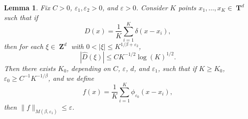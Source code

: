 \documentclass[12pt,reqno]{article}
\numberwithin{equation}{section}
\DeclareMathOperator{\ZZ}{\mathbf{Z}}
\DeclareMathOperator{\TT}{\mathbf{T}}
\newtheorem{lemma}{Lemma}
\begin{document}
\begin{lemma} \label{Lemma65493}
    Fix $C > 0$, $\varepsilon_1, \varepsilon_2 > 0$, and $\varepsilon > 0$. Consider $K$ points $x_1, \dots, x_K \in \TT^d$ such that if
    \[ D(x) = \frac{1}{K} \sum_{i = 1}^K \delta(x - x_i), \]
    then for each $\xi \in \ZZ^d$ with $0 < |\xi| \leq K^{1/\beta + \varepsilon_2}$,
    \begin{equation} \label{equationFFOSOXPFFGHI}
        |\widehat{D}(\xi)| \leq C K^{-1/2} \log(K)^{1/2}.
    \end{equation}
    Then there exists $K_0$, depending on $C$, $\varepsilon$, $d$, and $\varepsilon_1$, such that if $K \geq K_0$, $\varepsilon_0 \geq C^{-1} K^{-1/\beta}$, and we define
    \[ f(x) = \frac{1}{K} \sum_{i = 1}^K \phi_{\varepsilon_0}(x - x_i), \]
    then $\| f \|_{M(\beta,\varepsilon_1)} \leq \varepsilon$.
\end{lemma}
\end{document}

